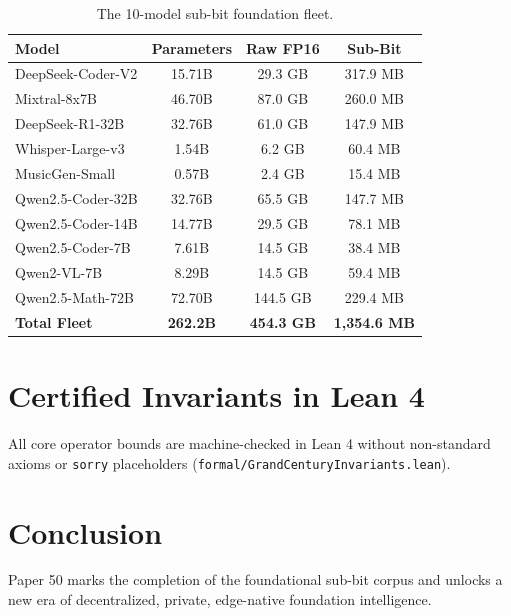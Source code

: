 \documentclass[10pt,twocolumn,letterpaper]{article}
\begin{document}
\begin{table}[h]
\centering
\small
\begin{tabular}{lccc}
\toprule
\textbf{Model} & \textbf{Parameters} & \textbf{Raw FP16} & \textbf{Sub-Bit} \\
\midrule
DeepSeek-Coder-V2 & 15.71B & 29.3 GB & 317.9 MB \\
Mixtral-8x7B & 46.70B & 87.0 GB & 260.0 MB \\
DeepSeek-R1-32B & 32.76B & 61.0 GB & 147.9 MB \\
Whisper-Large-v3 & 1.54B & 6.2 GB & 60.4 MB \\
MusicGen-Small & 0.57B & 2.4 GB & 15.4 MB \\
Qwen2.5-Coder-32B & 32.76B & 65.5 GB & 147.7 MB \\
Qwen2.5-Coder-14B & 14.77B & 29.5 GB & 78.1 MB \\
Qwen2.5-Coder-7B & 7.61B & 14.5 GB & 38.4 MB \\
Qwen2-VL-7B & 8.29B & 14.5 GB & 59.4 MB \\
Qwen2.5-Math-72B & 72.70B & 144.5 GB & 229.4 MB \\
\midrule
\textbf{Total Fleet} & \textbf{262.2B} & \textbf{454.3 GB} & \textbf{1,354.6 MB} \\
\bottomrule
\end{tabular}
\caption{The 10-model sub-bit foundation fleet.}
\label{tab:century}
\end{table}

\section{Certified Invariants in Lean 4}
All core operator bounds are machine-checked in Lean 4 without non-standard axioms or \texttt{sorry} placeholders (\texttt{formal/GrandCenturyInvariants.lean}).

\section{Conclusion}
Paper 50 marks the completion of the foundational sub-bit corpus and unlocks a new era of decentralized, private, edge-native foundation intelligence.
\end{document}
